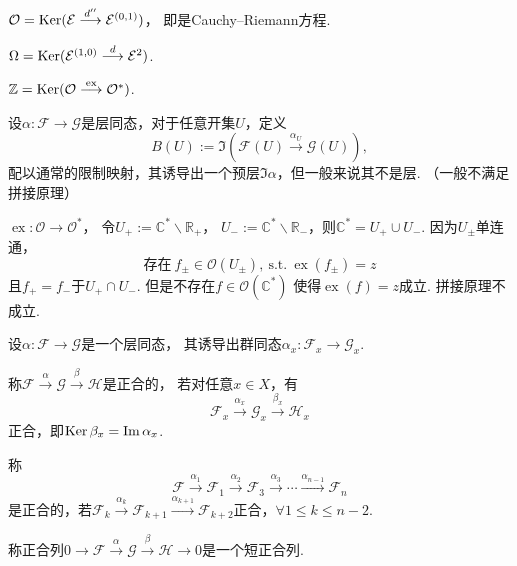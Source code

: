\begin{example}
	$\mathcal{O}=\operatorname{Ker}(\mathcal{E}\stackrel{d''}{\longrightarrow} \mathcal{E}^{(0,1)})$，
    即是Cauchy--Riemann方程.
			
	$\Omega=\operatorname{Ker}(\mathcal{E}^{(1,0)}\stackrel{d}{\longrightarrow} \mathcal{E}^2)$.
	
	$\mathbb{Z}=\operatorname{Ker}(\mathcal{O}\stackrel{\operatorname{ex}}{\longrightarrow} \mathcal{O}^*)$.
\end{example}

\begin{definition}
	设$\alpha\colon \mathscr{F}\rightarrow \mathscr{G}$是层同态，对于任意开集$U$，定义
	$$B(U):=\Im (\mathscr{F}(U)\stackrel{\alpha_U}{\longrightarrow} \mathscr{G}(U)),$$
	配以通常的限制映射，其诱导出一个预层$\Im\alpha$，但一般来说其不是层. 
    （一般不满足拼接原理）
\end{definition}

\begin{example}
	$\operatorname{ex}\colon\mathcal{O}\rightarrow \mathcal{O}^*$，
    令$U_+:=\mathbb{C}^*\backslash \mathbb{R}_+$，
    $U_-:=\mathbb{C}^*\backslash \mathbb{R}_-$，则$\mathbb{C}^*=U_+\cup U_-$. 
    因为$U_{\pm}$单连通，
	$$\text{存在}\ f_{\pm}\in \mathcal{O}(U_\pm),\ \text{s.t.} \ \operatorname{ex}(f_\pm)=z$$
	且$f_+=f_-$于$U_+\cap U_-$. 但是不存在$f\in \mathcal{O}(\mathbb{C}^*)$
    使得$\operatorname{ex}(f)=z$成立. 拼接原理不成立.
\end{example}

\begin{definition}
	设$\alpha\colon\mathscr{F}\rightarrow \mathscr{G}$是一个层同态，
    其诱导出群同态$\alpha_x\colon \mathscr{F}_x\rightarrow \mathscr{G}_x$.
		
	称$\mathscr{F}\stackrel{\alpha}{\longrightarrow} \mathscr{G}
    \stackrel{\beta}{\longrightarrow} \mathscr{H}$是正合的，
    若对任意$x\in X$，有
	$$\mathscr{F}_x\stackrel{\alpha_x}{\longrightarrow} \mathscr{G}_x
    \stackrel{\beta_x}{\longrightarrow} \mathscr{H}_x$$
	正合，即$\operatorname{Ker} \beta_x=\operatorname{Im} \alpha_x$.
		
	称$$\mathscr{F}\stackrel{\alpha_1}{\longrightarrow} \mathscr{F}_1
    \stackrel{\alpha_2}{\longrightarrow} \mathscr{F}_3
    \stackrel{\alpha_3}{\longrightarrow} \cdots 
    \stackrel{\alpha_{n-1}}{\longrightarrow} \mathscr{F}_n$$
	是正合的，若$\mathscr{F}_k\stackrel{\alpha_k}{\longrightarrow} \mathscr{F}_{k+1}
    \stackrel{\alpha_{k+1}}{\longrightarrow} \mathscr{F}_{k+2}$正合，$\forall 1\leq k\leq n-2$.
	
	称正合列$0\rightarrow \mathscr{F}\stackrel{\alpha}{\longrightarrow} \mathscr{G}
    \stackrel{\beta}{\longrightarrow} \mathscr{H}\rightarrow 0$是一个短正合列.
\end{definition}

